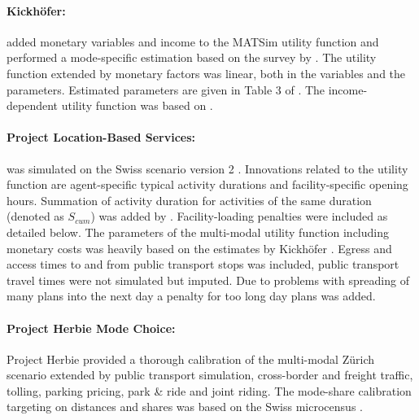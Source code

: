 \paragraph{Kickhöfer:}
\citet[][]{Kickhoefer_MastersThesis_2009} added monetary variables and income to the MATSim utility function and performed a mode-specific estimation based on the survey by \citet[][]{VrticEtAl_ResRep_SVI_2007}. The utility function extended by monetary factors was linear, both in the variables and the parameters. Estimated parameters are given in Table 3 of \citet[][]{Kickhoefer_MastersThesis_2009}. The income-dependent utility function was based on \citet[][]{Franklin_PhDThesis_2006}.

\paragraph{Project Location-Based Services:}
\citet[][]{BalmerEtAl_ResRep_datapuls_2010} was simulated on the Swiss scenario version 2 \citep[][]{HorniEtAl_TechRep_IVT_2011_a}. Innovations related to the utility function are agent-specific typical activity durations and facility-specific opening hours. Summation of activity duration for activities of the same duration (denoted as $S_{cum}$) was added by \citet[][p.9 and p.28]{BalmerEtAl_ResRep_datapuls_2010}. Facility-loading penalties were included as detailed below. The parameters \citep[][Table 2 on p.31]{BalmerEtAl_ResRep_datapuls_2010} of the multi-modal utility function including monetary costs was heavily based on the estimates by Kickhöfer \citep[][]{Kickhoefer_MastersThesis_2009}. Egress and access times to and from public transport stops was included, public transport travel times were not simulated but imputed. Due to problems with spreading of many plans into the next day a penalty for too long day plans was added.

\paragraph{Project Herbie Mode Choice:}
Project Herbie \citep[][]{VitinsEtAl_VW_2012} provided a thorough calibration of the multi-modal Zürich scenario extended by public transport simulation, cross-border and freight traffic, tolling, parking pricing, park \& ride and joint riding. The mode-share calibration targeting on distances and shares was based on the Swiss microcensus \citep[][p.18]{VitinsEtAl_VW_2012}.   


